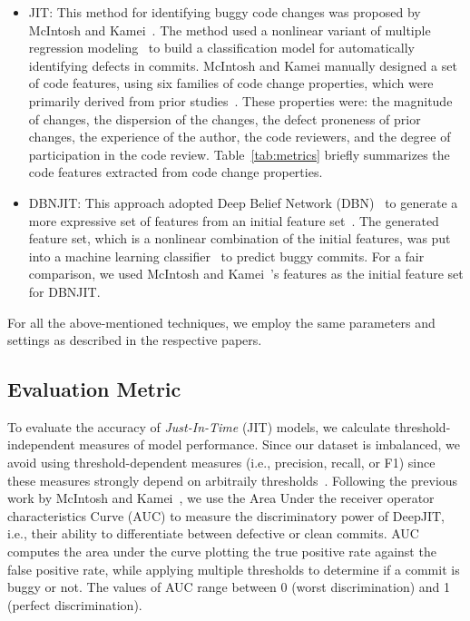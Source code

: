 \begin{itemize}
\item JIT: This method for identifying buggy code changes was proposed by McIntosh and Kamei~\cite{mcintosh2018fix}. The method used a nonlinear variant of multiple regression modeling~\cite{fox1997applied} to build a classification model for automatically identifying defects in commits. McIntosh and Kamei manually designed a set of code features, using six families of code change properties, which were primarily derived from prior studies~\cite{Kamei:2013:LES, Kim:2008:CSC, Kononenko:2015, Mockus2000}. These properties were: the magnitude of changes, the dispersion of the changes, the defect proneness of prior changes, the experience of the author, the code reviewers, and the degree of participation in the code review. Table~\ref{tab:metrics} briefly summarizes the code features extracted from code change properties.

\item DBNJIT: This approach adopted Deep Belief Network (DBN)~\cite{hinton2006reducing} to generate a more expressive set of features from an initial feature set~\cite{Yang:2015:DLJ}. The generated feature set, which is a nonlinear combination of the initial features, was put into a machine learning classifier~\cite{nasrabadi2007pattern} to predict buggy commits. For a fair comparison, we used McIntosh and Kamei~\cite{mcintosh2018fix}'s features as the initial feature set for DBNJIT. 
\end{itemize}

For all the above-mentioned techniques, we employ the same parameters and settings as described in the respective papers. 

\subsection{Evaluation Metric}
\label{sec:metric}
To evaluate the accuracy of \emph{Just-In-Time} (JIT) models, we calculate  threshold-independent measures of model performance. Since our dataset is imbalanced, we avoid using threshold-dependent measures (i.e., precision, recall, or F1) since these measures strongly depend on arbitraily thresholds~\cite{nguyen2009learning, gu2008data}. Following the previous work by McIntosh and Kamei~\cite{mcintosh2018fix}, we use the Area Under the receiver operator characteristics
Curve (AUC) to measure the discriminatory power of DeepJIT, i.e., their ability to differentiate between defective or clean commits. AUC computes the area under the curve plotting the true positive rate against the false positive rate, while applying multiple thresholds to determine if a commit is buggy or not. The values of AUC range between 0 (worst discrimination) and 1 (perfect discrimination).

